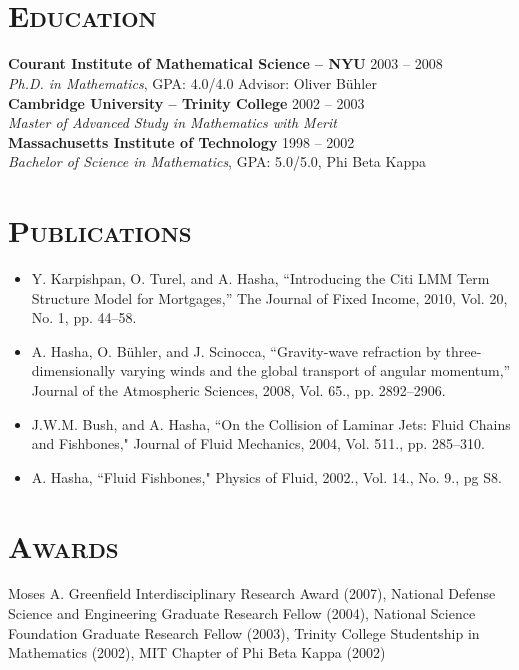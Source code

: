 \begin{resume}
\begin{formatb}
  \\
  \body\\
\end{formatb}

\section{\textsc{Education}}

\textbf{Courant Institute of Mathematical Science -- NYU} \hfill 2003 -- 2008 \\
\textit{Ph.D. in Mathematics}, GPA: 4.0/4.0 \hfill Advisor: Oliver B\"uhler \\
\newline
\textbf{Cambridge University -- Trinity College} \hfill 2002 -- 2003 \\
\textit{Master of Advanced Study in Mathematics with Merit} \\
\newline
\textbf{Massachusetts Institute of Technology} \hfill 1998 -- 2002 \\
\textit{Bachelor of Science in Mathematics}, GPA: 5.0/5.0, Phi Beta Kappa\\

\section{\textsc{Publications}}
\begin{itemize}
\item Y. Karpishpan, O. Turel, and A. Hasha, ``Introducing the Citi LMM Term Structure Model for Mortgages,''
The Journal of Fixed Income, 2010, Vol. 20, No. 1, pp. \mbox{44--58}.
\item A. Hasha, O. B\"uhler, and J. Scinocca,  ``Gravity-wave refraction by three-dimensionally
varying winds and the global transport of angular momentum,''
Journal of the Atmospheric Sciences, 2008, Vol. 65., pp.
\mbox{2892--2906}.
\item J.W.M. Bush, and A. Hasha, ``On the Collision of Laminar Jets:  Fluid Chains and Fishbones,"  Journal of Fluid Mechanics, 2004, Vol. 511., pp. 285--310.
\item A. Hasha, ``Fluid Fishbones," Physics of Fluid, 2002., Vol. 14., No. 9., pg S8.
\end{itemize}

\section{\textsc{Awards}}
Moses A. Greenfield Interdisciplinary Research Award (2007), National Defense Science and Engineering Graduate Research Fellow (2004), National Science Foundation Graduate Research Fellow (2003), Trinity College Studentship in Mathematics (2002), MIT Chapter of Phi Beta Kappa (2002)

\end{resume}

